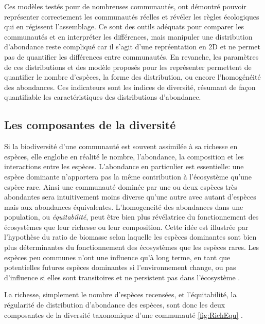 \documentclass[
  11pt,
  french,
  A4paper,
  extrafontsizes,onecolumn,openright
  ]{memoir}
\begin{document}
Ces modèles testés pour de nombreuses communautés, ont démontré pouvoir
représenter correctement les communautés réelles et révéler les règles
écologiques qui en régissent l'assemblage. Ce sont des outils adéquats
pour comparer les communautés et en interpréter les différences, mais
manipuler une distribution d'abondance reste compliqué car il s'agit
d'une repréentation en 2D et ne permet pas de quantifier les différences
entre communautés. En revanche, les paramètres de ces distributions et
des modèle proposés pour les représenter permettent de quantifier le
nombre d'espèces, la forme des distribution, ou encore l'homogénéité des
abondances. Ces indicateurs sont les indices de diversité, résumant de
façon quantifiable les caractéristiques des distributions d'abondance.

\subsection{Les composantes de la
diversité}\label{les-composantes-de-la-diversite}

Si la biodiversité d'une communauté est souvent assimilée à sa richesse
en espèces, elle englobe en réalité le nombre, l'abondance, la
composition et les interactions entre les espèces. L'abondance en
particulier est essentielle: une espèce dominante n'apportera pas la
même contribution à l'écosystème qu'une espèce rare. Ainsi une
communauté dominée par une ou deux espèces très abondantes sera
intuitivement moins diverse qu'une autre avec autant d'espèces mais aux
abondances équivalentes. L'homogeneité des abondances dans une
population, ou \emph{équitabilité}, peut être bien plus révélatrice du
fonctionnement des écosystèmes que leur richesse ou leur composition.
Cette idée est illustrée par l'hypothèse du ratio de biomasse selon
laquelle les espèces dominantes sont bien plus déterminantes du
fonctionnement des écosystèmes que les espèces rares. Les espèces peu
communes n'ont une influence qu'à long terme, en tant que potentielles
futures espèces dominantes si l'environnement change, ou pas d'influence
si elles sont transitoires et ne persistent pas dans l'écosystème
\autocite{Grime1998}.

La richesse, simplement le nombre d'espèces recensées, et
l'équitabilité, la régularité de distribution d'abondance des espèces,
sont donc les deux composantes de la diversité taxonomique d'une
communauté \ref{fig:RichEqu} \autocites{Whittaker1965}{Magurran2004}.
\end{document}
